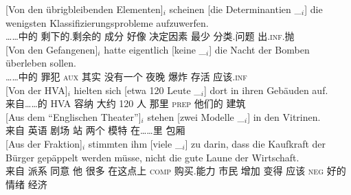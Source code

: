 \begin{sloppypar}
\eal
\ex 
\gll {}[Von den übrigbleibenden Elementen]$_i$ scheinen [die Determinantien \_$_i$] die wenigsten Klassifizierungsprobleme aufzuwerfen.\footnotemark\\
     \spacebr{}……中的  剩下的.剩余的 成分 好像 \spacebr{} 决定因素 {}  最少 分类.问题 出.\textsc{inf}.抛\\
\ex\label{bsp-von-den-gefangenen} 
\gll {}[Von den Gefangenen]$_i$ hatte eigentlich [keine \_$_i$] die Nacht der Bomben überleben sollen.\footnotemark\\
	 {}\spacebr{}……中的  罪犯 \textsc{aux} 其实 \spacebr{}没有一个 {}  夜晚  爆炸 存活 应该.\textsc{inf}\\
\ex 
\gll {}[Von der HVA]$_i$ hielten sich [etwa 120 Leute \_$_i$] dort in ihren Gebäuden auf.\footnotemark\\
	 {}\spacebr{}来自……的  HVA 容纳  \spacebr{}大约 120 人 {} 那里 \textsc{prep} 他们的 建筑 \prt{}\\
\ex 
\gll {}[Aus dem "`Englischen Theater"']$_i$ stehen [zwei Modelle \_$_i$] in den Vitrinen.\footnotemark\hspace{-3pt}\\
	 {}\spacebr{}来自  英语 剧场 站 \spacebr{}两个 模特 {} 在……里  包厢\\
\largerpage
\ex 
\gll {}[Aus der Fraktion]$_i$ stimmten ihm [viele \_$_i$] zu darin, dass die Kaufkraft der Bürger gepäppelt werden müsse, nicht die gute Laune der Wirtschaft.\footnotemark\\
	 {}\spacebr{}来自  派系 同意 他 \spacebr{}很多 {} \prt{} 在这点上 \textsc{comp}  购买.能力  市民 增加 变得 应该 \textsc{neg}  好的 情绪  经济\\

\end{sloppypar}
